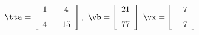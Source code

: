 {$\tta = \left[ \begin {array}{cc} 1&-4\\\noalign{\medskip}4&-15\end {array}
 \right] ,$
 \quad
$\vb =\left[ \begin {array}{c} 21\\\noalign{\medskip}77\end {array}
 \right]$ 
}
{$\vx = \left[ \begin {array}{c} -7\\\noalign{\medskip}-7\end {array}
 \right]$}
 